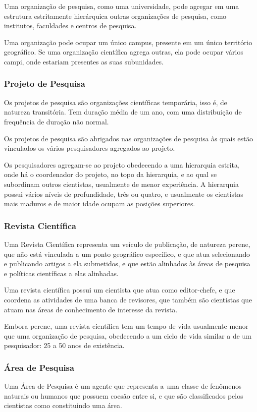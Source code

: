 Uma organização de pesquisa, como uma universidade, pode agregar em uma estrutura estritamente hierárquica outras organizações de pesquisa, como institutos, faculdades e centros de pesquisa.

Uma organização pode ocupar um único campus, presente em um único território geográfico. Se uma organização científica agrega outras, ela pode ocupar vários campi, onde estariam presentes as suas subunidades.

\subsubsection{Projeto de Pesquisa}
Os projetos de pesquisa são organizações científicas temporária, isso é, de natureza transitória. Tem duração média de um ano, com uma distribuição de frequência de duração não normal.

Os projetos de pesquisa são abrigados nas organizações de pesquisa às quais estão vinculados os vários pesquisadores agregados ao projeto. 

Os pesquisadores agregam-se ao projeto obedecendo a uma hierarquia estrita, onde há o coordenador do projeto, no topo da hierarquia, e ao qual se subordinam outros cientistas, usualmente de menor experiência.
A hierarquia possui vários níveis de profundidade, três ou quatro, e usualmente os cientistas mais maduros e de maior idade ocupam as posições superiores.

\subsubsection{Revista Científica}
Uma Revista Científica representa um veículo de publicação, de natureza perene, que não está vinculada a um ponto geográfico específico, e que  atua selecionando e publicando artigos a ela submetidos, e que estão alinhados às áreas de pesquisa e políticas científicas a elas alinhadas.

Uma revista científica possui um cientista que atua como editor-chefe, e que coordena as atividades de uma banca de revisores, que também são cientistas que atuam nas áreas de conhecimento de interesse da revista.

Embora perene, uma revista científica tem um tempo de vida usualmente menor que uma organização de pesquisa, obedecendo a um ciclo de vida similar a de um pesquisador: 25 a 50 anos de existência.

\subsubsection{Área de Pesquisa}
Uma Área de Pesquisa é um agente que representa a uma classe de fenômenos naturais ou humanos que possuem coesão entre si, e que são classificados pelos cientistas como constituindo uma área. 

